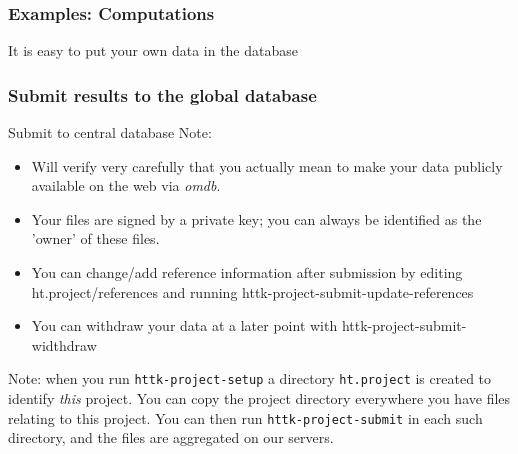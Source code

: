 \documentclass[dvipsnames]{beamer}
\begin{document}


\begin{frame}
\frametitle{Examples: Computations}
It is easy to put your own data in the database
\end{frame}


\begin{frame}
\frametitle{Submit results to the global database}

Submit to central database
Note:
\begin{itemize}
\item Will verify very carefully that you actually mean to make your data publicly available on the web via \emph{omdb}.
\item Your files are signed by a private key; you can always be identified as the 'owner' of these files.
\item You can change/add reference information after submission by editing ht.project/references and running httk-project-submit-update-references
\item You can withdraw your data at a later point with httk-project-submit-widthdraw
\end{itemize}

\scriptsize
Note: when you run \texttt{httk-project-setup} a directory \texttt{ht.project} is created to identify \emph{this} project. You can copy the project directory everywhere you have files relating to this project. You can then run \texttt{httk-project-submit} in each such directory, and the files are aggregated on our servers.

\end{frame}
\end{document}
